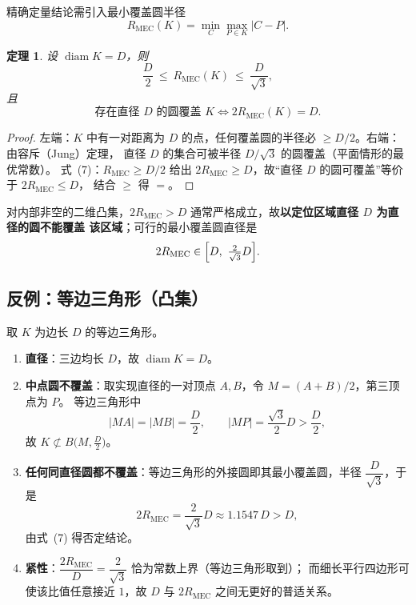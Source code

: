\documentclass[11pt,a4paper]{ctexart}
\newtheorem{theorem}{定理}
\theoremstyle{definition}
\theoremstyle{remark}
\newcommand{\diam}{\operatorname{diam}}
\newcommand{\MEC}{\operatorname{MEC}}
\begin{document}

精确定量结论需引入最小覆盖圆半径
\begin{equation}
R_{\MEC}(K)=\min_{C}\max_{P\in K}|C-P| .
\end{equation}

\begin{theorem}\label{thm:mec}
设 $\diam K=D$，则
\begin{equation}
\frac D2\ \le\ R_{\MEC}(K)\ \le\ \frac{D}{\sqrt3},
\tag{6}
\end{equation}
且
\begin{equation}
\text{存在直径 }D\text{ 的圆覆盖 }K\iff 2R_{\MEC}(K)=D .
\tag{7}
\end{equation}
\end{theorem}

\begin{proof}
左端：$K$ 中有一对距离为 $D$ 的点，任何覆盖圆的半径必 $\ge D/2$。右端：由容斥（Jung）定理，
直径 $D$ 的集合可被半径 $D/\sqrt3$ 的圆覆盖（平面情形的最优常数）。
式~(7)：$R_{\MEC}\ge D/2$ 给出 $2R_{\MEC}\ge D$，故“直径 $D$ 的圆可覆盖”等价于 $2R_{\MEC}\le D$，
结合 $\ge$ 得 $=$。
\end{proof}

对内部非空的二维凸集，$2R_{\MEC}>D$ 通常严格成立，故\textbf{以定位区域直径 $D$ 为直径的圆不能覆盖
该区域}；可行的最小覆盖圆直径是
\[
2R_{\MEC}\in\Bigl[D,\ \tfrac{2}{\sqrt3}D\Bigr].
\]

\subsection{反例：等边三角形（凸集）}

取 $K$ 为边长 $D$ 的等边三角形。

\begin{enumerate}[label=\textbf{(\arabic*)}]
\item \textbf{直径}：三边均长 $D$，故 $\diam K=D$。
\item \textbf{中点圆不覆盖}：取实现直径的一对顶点 $A,B$，令 $M=(A+B)/2$，第三顶点为 $P$。
等边三角形中
\[
|MA|=|MB|=\frac D2,\qquad |MP|=\frac{\sqrt3}{2}D>\frac D2 ,
\]
故 $K\not\subset B\bigl(M,\tfrac D2\bigr)$。
\item \textbf{任何同直径圆都不覆盖}：等边三角形的外接圆即其最小覆盖圆，半径 $\dfrac{D}{\sqrt3}$，于是
\[
2R_{\MEC}=\frac{2}{\sqrt3}D\approx1.1547\,D>D ,
\]
由式~(7) 得否定结论。
\item \textbf{紧性}：$\dfrac{2R_{\MEC}}{D}=\dfrac{2}{\sqrt3}$ 恰为常数上界（等边三角形取到）；
而细长平行四边形可使该比值任意接近 $1$，故 $D$ 与 $2R_{\MEC}$ 之间无更好的普适关系。
\end{enumerate}
\end{document}

